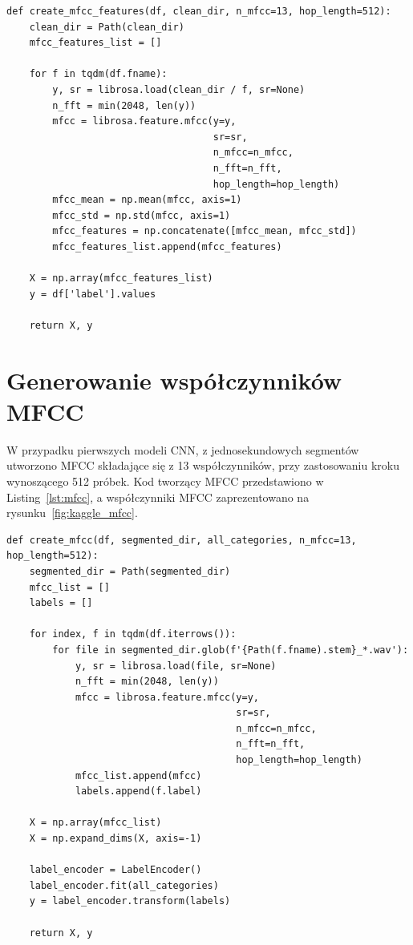 \documentclass{SGGW-thesis}
\begin{document}
\begin{lstlisting}[caption=Funkcja obliczająca statystyki MFCC poszczególnych nagrań, label={lst:mfcc_features}, captionpos=b]
def create_mfcc_features(df, clean_dir, n_mfcc=13, hop_length=512):
    clean_dir = Path(clean_dir)
    mfcc_features_list = []
    
    for f in tqdm(df.fname):
        y, sr = librosa.load(clean_dir / f, sr=None)
        n_fft = min(2048, len(y))
        mfcc = librosa.feature.mfcc(y=y, 
                                    sr=sr, 
                                    n_mfcc=n_mfcc, 
                                    n_fft=n_fft, 
                                    hop_length=hop_length)
        mfcc_mean = np.mean(mfcc, axis=1)
        mfcc_std = np.std(mfcc, axis=1)
        mfcc_features = np.concatenate([mfcc_mean, mfcc_std])
        mfcc_features_list.append(mfcc_features)

    X = np.array(mfcc_features_list)
    y = df['label'].values

    return X, y
\end{lstlisting}

\section{Generowanie współczynników MFCC}
W przypadku pierwszych modeli CNN, z jednosekundowych segmentów utworzono MFCC składające się z 13 współczynników, przy zastosowaniu kroku wynoszącego 512 próbek. Kod tworzący MFCC przedstawiono w Listing~\ref{lst:mfcc}, a współczynniki MFCC zaprezentowano na rysunku~\ref{fig:kaggle_mfcc}.

\begin{lstlisting}[caption=Funkcja tworząca MFCC z jednosekundowego segmentu nagrania, label={lst:mfcc}, captionpos=b]
def create_mfcc(df, segmented_dir, all_categories, n_mfcc=13, hop_length=512):
    segmented_dir = Path(segmented_dir)
    mfcc_list = []
    labels = []
    
    for index, f in tqdm(df.iterrows()):
        for file in segmented_dir.glob(f'{Path(f.fname).stem}_*.wav'):
            y, sr = librosa.load(file, sr=None)
            n_fft = min(2048, len(y))
            mfcc = librosa.feature.mfcc(y=y, 
                                        sr=sr, 
                                        n_mfcc=n_mfcc, 
                                        n_fft=n_fft, 
                                        hop_length=hop_length)
            mfcc_list.append(mfcc)
            labels.append(f.label)
        
    X = np.array(mfcc_list)
    X = np.expand_dims(X, axis=-1)

    label_encoder = LabelEncoder()
    label_encoder.fit(all_categories)
    y = label_encoder.transform(labels)

    return X, y
\end{lstlisting}
\end{document}
